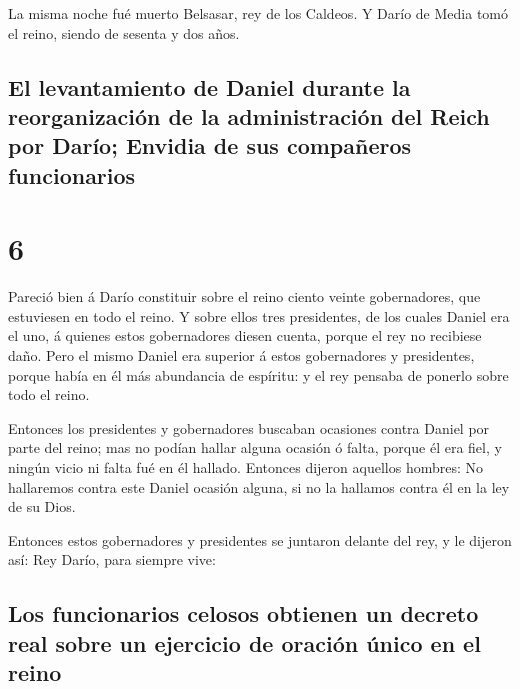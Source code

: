  La misma noche fué muerto Belsasar, rey de los Caldeos.
 Y Darío de Media tomó el reino, siendo de sesenta y dos
años.

\hypertarget{el-levantamiento-de-daniel-durante-la-reorganizaciuxf3n-de-la-administraciuxf3n-del-reich-por-daruxedo-envidia-de-sus-compauxf1eros-funcionarios}{%
\subsection{El levantamiento de Daniel durante la reorganización de la
administración del Reich por Darío; Envidia de sus compañeros
funcionarios}\label{el-levantamiento-de-daniel-durante-la-reorganizaciuxf3n-de-la-administraciuxf3n-del-reich-por-daruxedo-envidia-de-sus-compauxf1eros-funcionarios}}

\hypertarget{section-5}{%
\section{6}\label{section-5}}

 Pareció bien á Darío constituir sobre el reino ciento
veinte gobernadores, que estuviesen en todo el reino.  Y
sobre ellos tres presidentes, de los cuales Daniel era el uno, á quienes
estos gobernadores diesen cuenta, porque el rey no recibiese daño.
 Pero el mismo Daniel era superior á estos gobernadores y
presidentes, porque había en él más abundancia de espíritu: y el rey
pensaba de ponerlo sobre todo el reino.

 Entonces los presidentes y gobernadores buscaban
ocasiones contra Daniel por parte del reino; mas no podían hallar alguna
ocasión ó falta, porque él era fiel, y ningún vicio ni falta fué en él
hallado.  Entonces dijeron aquellos hombres: No hallaremos
contra este Daniel ocasión alguna, si no la hallamos contra él en la ley
de su Dios.

 Entonces estos gobernadores y presidentes se juntaron
delante del rey, y le dijeron así: Rey Darío, para siempre vive:

\hypertarget{los-funcionarios-celosos-obtienen-un-decreto-real-sobre-un-ejercicio-de-oraciuxf3n-uxfanico-en-el-reino}{%
\subsection{Los funcionarios celosos obtienen un decreto real sobre un
ejercicio de oración único en el
reino}\label{los-funcionarios-celosos-obtienen-un-decreto-real-sobre-un-ejercicio-de-oraciuxf3n-uxfanico-en-el-reino}}

